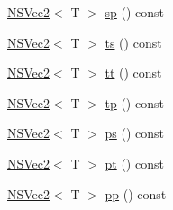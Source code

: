 \begin{DoxyCompactItemize}
\item 
\hyperlink{structNSVec2}{N\-S\-Vec2}$<$ T $>$ \hyperlink{structNSVec3_a48cf8f3b52f92cd404091afb3f224614}{sp} () const 
\item 
\hyperlink{structNSVec2}{N\-S\-Vec2}$<$ T $>$ \hyperlink{structNSVec3_af5f7aaebcbafd62fbce6c238b0314694}{ts} () const 
\item 
\hyperlink{structNSVec2}{N\-S\-Vec2}$<$ T $>$ \hyperlink{structNSVec3_a4e4137be0b747c99671a0e15cf63c382}{tt} () const 
\item 
\hyperlink{structNSVec2}{N\-S\-Vec2}$<$ T $>$ \hyperlink{structNSVec3_a0247b88d663cd19ed53666f334e64421}{tp} () const 
\item 
\hyperlink{structNSVec2}{N\-S\-Vec2}$<$ T $>$ \hyperlink{structNSVec3_a59f2b5d81a010457659786e1a6d0456e}{ps} () const 
\item 
\hyperlink{structNSVec2}{N\-S\-Vec2}$<$ T $>$ \hyperlink{structNSVec3_a3694fd686ccd5837fdf11b97a9739ebd}{pt} () const 
\item 
\hyperlink{structNSVec2}{N\-S\-Vec2}$<$ T $>$ \hyperlink{structNSVec3_a26cfb322d80fabe9b3d26ad57ee48e3c}{pp} () const 
\end{DoxyCompactItemize}
